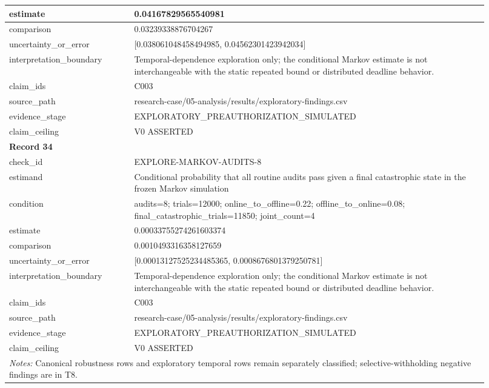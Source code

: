 \begin{longtable}{|p{0.24\linewidth}|p{0.68\linewidth}|}
estimate & 0.04167829565540981 \\ \hline
comparison & 0.03239338876704267 \\ \hline
uncertainty\_\allowbreak{}or\_\allowbreak{}error & [0.038061048458494985, 0.04562301423942034] \\ \hline
interpretation\_\allowbreak{}boundary & Temporal-dependence exploration only;\allowbreak{} the conditional Markov estimate is not interchangeable with the static repeated bound or distributed deadline behavior. \\ \hline
claim\_\allowbreak{}ids & C003 \\ \hline
source\_\allowbreak{}path & research-case/05-analysis/results/exploratory-findings.csv \\ \hline
evidence\_\allowbreak{}stage & EXPLORATORY\_\allowbreak{}PREAUTHORIZATION\_\allowbreak{}SIMULATED \\ \hline
claim\_\allowbreak{}ceiling & V0 ASSERTED \\ \hline
\multicolumn{2}{|l|}{\textbf{Record 34}} \\ \hline
check\_\allowbreak{}id & EXPLORE-MARKOV-AUDITS-8 \\ \hline
estimand & Conditional probability that all routine audits pass given a final catastrophic state in the frozen Markov simulation \\ \hline
condition & audits=8;\allowbreak{} trials=12000;\allowbreak{} online\_\allowbreak{}to\_\allowbreak{}offline=0.22;\allowbreak{} offline\_\allowbreak{}to\_\allowbreak{}online=0.08;\allowbreak{} final\_\allowbreak{}catastrophic\_\allowbreak{}trials=11850;\allowbreak{} joint\_\allowbreak{}count=4 \\ \hline
estimate & 0.00033755274261603374 \\ \hline
comparison & 0.0010493316358127659 \\ \hline
uncertainty\_\allowbreak{}or\_\allowbreak{}error & [0.00013127525234485365, 0.0008676801379250781] \\ \hline
interpretation\_\allowbreak{}boundary & Temporal-dependence exploration only;\allowbreak{} the conditional Markov estimate is not interchangeable with the static repeated bound or distributed deadline behavior. \\ \hline
claim\_\allowbreak{}ids & C003 \\ \hline
source\_\allowbreak{}path & research-case/05-analysis/results/exploratory-findings.csv \\ \hline
evidence\_\allowbreak{}stage & EXPLORATORY\_\allowbreak{}PREAUTHORIZATION\_\allowbreak{}SIMULATED \\ \hline
claim\_\allowbreak{}ceiling & V0 ASSERTED \\ \hline
\multicolumn{2}{|p{0.92\linewidth}|}{\textit{Notes:} Canonical robustness rows and exploratory temporal rows remain separately classified; selective-withholding negative findings are in T8.} \\ \hline
\end{longtable}
\endgroup


